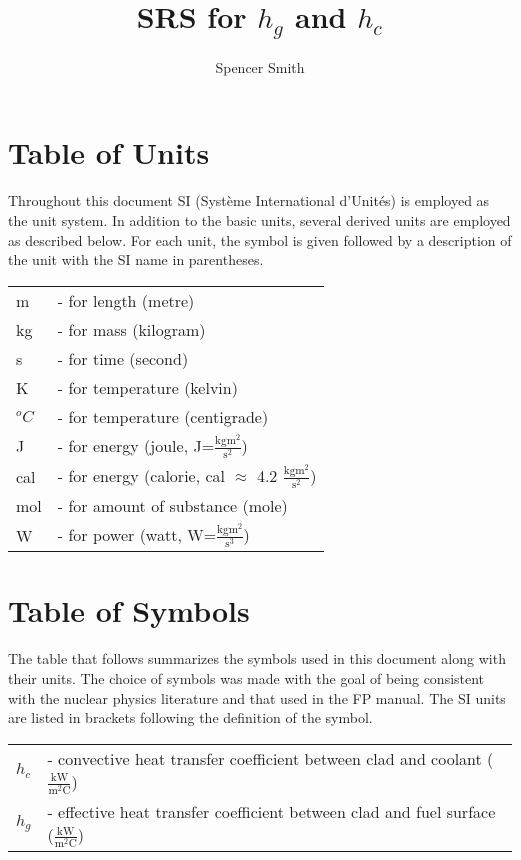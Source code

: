 \documentclass{article}
\title{SRS for $h_g$ and $h_c$}
\author{Spencer Smith}
\newcommand{\blt}{- } %
\begin{document}
\maketitle

\section*{Table of Units}

Throughout this document SI (Syst\`{e}me International d'Unit\'{e}s) is employed
as the unit system.  In addition to the basic units, several derived units are
employed as described below.  For each unit, the symbol is given followed by a
description of the unit with the SI name in parentheses.  ~\newline

\begin{longtable}{l p{11cm}}

m & \blt for length (metre)\\
kg & \blt for mass (kilogram)\\
s & \blt for time (second)\\
K & \blt for temperature (kelvin)\\
$^oC$ & \blt for temperature (centigrade)\\
J & \blt for energy (joule, J=$\mathrm{\frac{kg m^2}{s^2}}$)\\
cal & \blt for energy (calorie, cal $\approx$ 4.2 $\mathrm{\frac{kg m^2}{s^2}}$)\\
mol& \blt for amount of substance (mole)\\
W &\blt for power (watt, W=$\mathrm{\frac{kgm^2}{s^3}}$)\\

\end{longtable}

\section*{Table of Symbols}

The table that follows summarizes the symbols used in this document along with
their units.  The choice of symbols was made with the goal of being consistent
with the nuclear physics literature and that used in the FP manual.  The SI
units are listed in brackets following the definition of the symbol.

\begin{longtable}{l p{10.5cm}}
$h_c$ & \blt convective heat transfer coefficient between clad and coolant ($\mathrm{\frac{kW}{m^2C}}$)\\
$h_g$ & \blt effective heat transfer coefficient between clad and fuel surface ($\mathrm{\frac{kW}{m^2C}}$)\\
\end{longtable}
\end{document}
